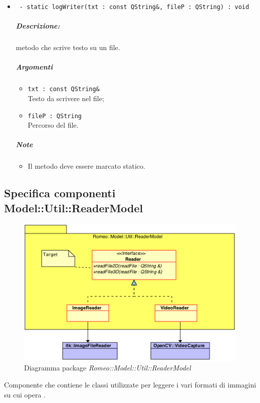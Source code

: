 \begin{itemize}
		\item \color{blue}\verb! - static logWriter(txt : const QString&, fileP : QString) : void!\\
		\color{black}
		\subparagraph{Descrizione:} metodo che scrive testo su un  file.
		\subparagraph{Argomenti}
			\begin{itemize}
				\item \color{RoyalPurple}\verb!txt : const QString&!\\
				\color{black}Testo da scrivere nel file;
				
				\item \color{RoyalPurple}\verb!fileP : QString!\\
				\color{black}Percorso del file.
			\end{itemize}
		\subparagraph{Note}
			\begin{itemize}
				\item Il metodo deve essere marcato statico.
			\end{itemize}
		
		
	\end{itemize}


\color{black}
\subsection{Specifica componenti Model::Util::ReaderModel}
\label{specificaReaderModel}
\begin{figure}[!h]
\centering
\includegraphics[scale=0.8]{../Specifica_Tecnica/Content/Immagini/Romeo__Model__Util__ReaderModel.png}
			\caption{Diagramma package \textsl{Romeo::Model::Util::ReaderModel}}
			\label{comp_romeo::model::util::readermodel}
\end{figure}
Componente che contiene le classi utilizzate per leggere i vari formati di immagini su cui opera \project.

